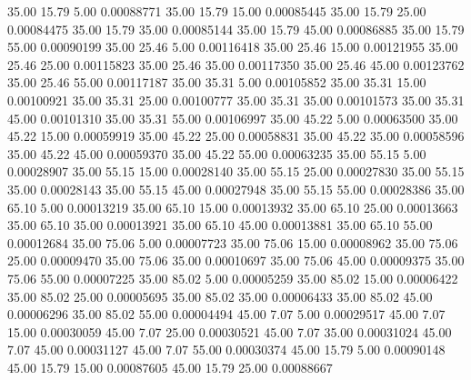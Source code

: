      35.00     15.79      5.00     0.00088771
     35.00     15.79     15.00     0.00085445
     35.00     15.79     25.00     0.00084475
     35.00     15.79     35.00     0.00085144
     35.00     15.79     45.00     0.00086885
     35.00     15.79     55.00     0.00090199
     35.00     25.46      5.00     0.00116418
     35.00     25.46     15.00     0.00121955
     35.00     25.46     25.00     0.00115823
     35.00     25.46     35.00     0.00117350
     35.00     25.46     45.00     0.00123762
     35.00     25.46     55.00     0.00117187
     35.00     35.31      5.00     0.00105852
     35.00     35.31     15.00     0.00100921
     35.00     35.31     25.00     0.00100777
     35.00     35.31     35.00     0.00101573
     35.00     35.31     45.00     0.00101310
     35.00     35.31     55.00     0.00106997
     35.00     45.22      5.00     0.00063500
     35.00     45.22     15.00     0.00059919
     35.00     45.22     25.00     0.00058831
     35.00     45.22     35.00     0.00058596
     35.00     45.22     45.00     0.00059370
     35.00     45.22     55.00     0.00063235
     35.00     55.15      5.00     0.00028907
     35.00     55.15     15.00     0.00028140
     35.00     55.15     25.00     0.00027830
     35.00     55.15     35.00     0.00028143
     35.00     55.15     45.00     0.00027948
     35.00     55.15     55.00     0.00028386
     35.00     65.10      5.00     0.00013219
     35.00     65.10     15.00     0.00013932
     35.00     65.10     25.00     0.00013663
     35.00     65.10     35.00     0.00013921
     35.00     65.10     45.00     0.00013881
     35.00     65.10     55.00     0.00012684
     35.00     75.06      5.00     0.00007723
     35.00     75.06     15.00     0.00008962
     35.00     75.06     25.00     0.00009470
     35.00     75.06     35.00     0.00010697
     35.00     75.06     45.00     0.00009375
     35.00     75.06     55.00     0.00007225
     35.00     85.02      5.00     0.00005259
     35.00     85.02     15.00     0.00006422
     35.00     85.02     25.00     0.00005695
     35.00     85.02     35.00     0.00006433
     35.00     85.02     45.00     0.00006296
     35.00     85.02     55.00     0.00004494
     45.00      7.07      5.00     0.00029517
     45.00      7.07     15.00     0.00030059
     45.00      7.07     25.00     0.00030521
     45.00      7.07     35.00     0.00031024
     45.00      7.07     45.00     0.00031127
     45.00      7.07     55.00     0.00030374
     45.00     15.79      5.00     0.00090148
     45.00     15.79     15.00     0.00087605
     45.00     15.79     25.00     0.00088667
